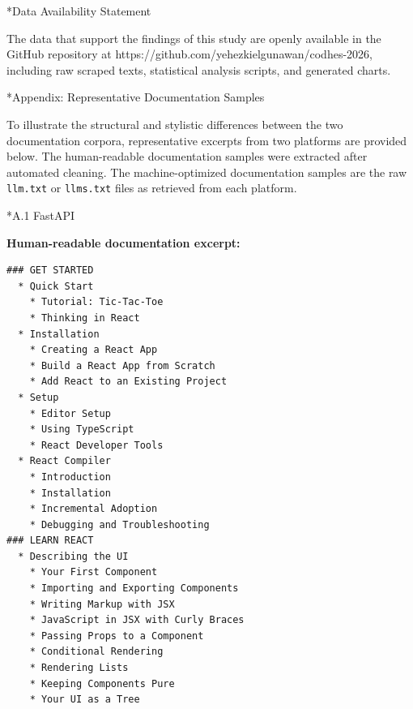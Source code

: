 \documentclass[10pt,conference,a4paper]{IEEEtran}
\makeatletter
\let\oldsection\section
\let\oldsubsection\subsection
\renewcommand{\section}{%
    \@ifstar{\sectionStar}{\sectionNoStar}%
}
\newcommand{\sectionStar}[1]{%
    \oldsection*{#1}%
    \vspace{-4pt}%
}
\newcommand{\sectionNoStar}[1]{%
    \oldsection{#1}%
    \vspace{-4pt}%
}
\renewcommand{\subsection}{%
    \@ifstar{\subsectionStar}{\subsectionNoStar}%
}
\newcommand{\subsectionStar}[1]{%
    \oldsubsection*{\textit{#1}}%
    \vspace{-3pt}%
}
\newcommand{\subsectionNoStar}[1]{%
    \oldsubsection{\textit{#1}}%
    \vspace{-3pt}%
}
\makeatother
\begin{document}
\section*{Data Availability Statement}

The data that support the findings of this study are openly available in the GitHub repository at https://github.com/yehezkielgunawan/codhes-2026, including raw scraped texts, statistical analysis scripts, and generated charts.

\section*{Appendix: Representative Documentation Samples}

To illustrate the structural and stylistic differences
between the two documentation corpora, representative
excerpts from two platforms are provided below.
The human-readable documentation samples were extracted
after automated cleaning. The machine-optimized
documentation samples are the raw \texttt{llm.txt} or
\texttt{llms.txt} files as retrieved from each platform.

\subsection*{A.1 FastAPI}
\vspace{6pt}

\textbf{Human-readable documentation excerpt:}
{\tiny
\begin{verbatim}
### GET STARTED
  * Quick Start
    * Tutorial: Tic-Tac-Toe
    * Thinking in React
  * Installation
    * Creating a React App
    * Build a React App from Scratch
    * Add React to an Existing Project
  * Setup
    * Editor Setup
    * Using TypeScript
    * React Developer Tools
  * React Compiler
    * Introduction
    * Installation
    * Incremental Adoption
    * Debugging and Troubleshooting
### LEARN REACT
  * Describing the UI
    * Your First Component
    * Importing and Exporting Components
    * Writing Markup with JSX
    * JavaScript in JSX with Curly Braces
    * Passing Props to a Component
    * Conditional Rendering
    * Rendering Lists
    * Keeping Components Pure
    * Your UI as a Tree
\end{verbatim}
}
\end{document}
